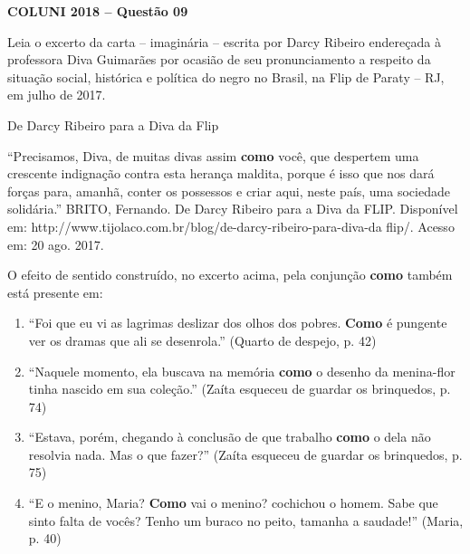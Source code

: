 \textbf{COLUNI 2018 -- Questão 09}\par\medskip Leia o excerto da carta – imaginária – escrita por Darcy Ribeiro endereçada à professora Diva Guimarães por ocasião de seu pronunciamento a respeito da situação social, histórica e política do negro no Brasil, na Flip de Paraty – RJ, em julho de 2017.

\par

De Darcy Ribeiro para a Diva da Flip

\par

“Precisamos, Diva, de muitas divas assim \textbf{como} você, que despertem uma crescente indignação contra esta herança maldita, porque é isso que nos dará forças para, amanhã, conter os possessos e criar aqui, neste país, uma sociedade solidária.” BRITO, Fernando. De Darcy Ribeiro para a Diva da FLIP. Disponível em: http://www.tijolaco.com.br/blog/de-darcy-ribeiro-para-diva-da flip/. Acesso em: 20 ago. 2017.

\par

O efeito de sentido construído, no excerto acima, pela conjunção \textbf{como} também está presente em:\begin{enumerate}
\item “Foi que eu vi as lagrimas deslizar dos olhos dos pobres. \textbf{Como} é pungente ver os dramas que ali se
       desenrola.” (Quarto de despejo, p. 42)
\item “Naquele momento, ela buscava na memória \textbf{como} o desenho da menina-flor tinha nascido em sua coleção.”
       (Zaíta esqueceu de guardar os brinquedos, p. 74)
\item “Estava, porém, chegando à conclusão de que trabalho \textbf{como} o dela não resolvia nada. Mas o que fazer?”
       (Zaíta esqueceu de guardar os brinquedos, p. 75)
\item “E o menino, Maria? \textbf{Como} vai o menino? cochichou o homem. Sabe que sinto falta de vocês? Tenho um
       buraco no peito, tamanha a saudade!” (Maria, p. 40)\end{enumerate}

